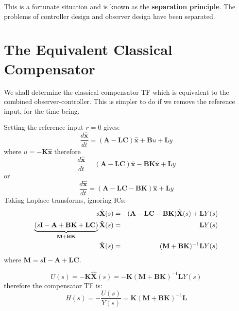 This is a fortunate situation and is known as the \textbf{separation principle}. The problems of controller design and observer design have been separated.
 


\section*{The Equivalent Classical Compensator} %
\label{sec:the_equivalent_classical_compensator}

We shall determine the classical compensator TF which is equivalent to the combined observer-controller. This is simpler to do if we remove the reference input, for the time being.
\begin{center}
\end{center}

Setting the reference input $r = 0$  gives:
\[
\frac{d\hat{\mathbf{x}}}{dt}=(\mathbf{A}-\mathbf{LC})\hat{\mathbf{x}}+ \mathbf{B}u+\mathbf{L}y
\]
where $u=-\mathbf{K}\hat{\mathbf{x}}$ therefore
\[
\frac{d\hat{\mathbf{x}}}{dt}=(\mathbf{A}-\mathbf{LC})\hat{\mathbf{x}} - \mathbf{BK}\hat{\mathbf{x}}+\mathbf{L}y
\]
or
\[
\frac{d\hat{\mathbf{x}}}{dt}=(\mathbf{A} - \mathbf{LC} - \mathbf{BK})\hat{\mathbf{x}} + \mathbf{L}y
\]
Taking Laplace transforms, ignoring ICs:
\begin{eqnarray*}
s\hat{\mathbf{X}}(s) & = & (\mathbf{A} - \mathbf{LC} - \mathbf{BK})\hat{\mathbf{X}}(s) + \mathbf{L}Y(s) \\	
\underbrace {(s{\bf{I}} - {\bf{A}} + {\bf{BK}} + {\bf{LC}})}_{{\bf{M + BK}}}{\bf{\hat X}}(s) & = & {\bf{L}}Y(s) \\
\hat{\mathbf{X}}(s) & = & (\mathbf{M}+\mathbf{BK})^{-1}{\bf{L}}Y(s)
\end{eqnarray*}
where $\mathbf{M}=s\mathbf{I}-\mathbf{A}+\mathbf{LC}$.
 
\[
U(s)=-\mathbf{K}\hat{\mathbf{X}}(s)=-\mathbf{K}(\mathbf{M}+\mathbf{BK})^{-1}\mathbf{L}Y(s)
\]
therefore the compensator TF is:
\[
H(s)=-\frac{U(s)}{Y(s)}=\mathbf{K}(\mathbf{M}+\mathbf{BK})^{-1}\mathbf{L}
\]


